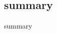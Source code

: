 \subsection{summary}

\begin{frame}{summary}{}
   \begin{center}
       \resizebox{\textwidth}{!}{
         
       }
 \end{center}
\end{frame}

